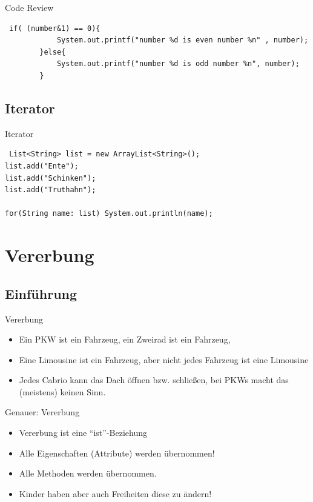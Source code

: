 \documentclass[18pt]{beamer}
\begin{document}
\begin{frame}[fragile]{Code Review}
 \begin{lstlisting}
 if( (number&1) == 0){
            System.out.printf("number %d is even number %n" , number);
        }else{
            System.out.printf("number %d is odd number %n", number);
        }
 \end{lstlisting}
\end{frame}

\subsection{Iterator}
\begin{frame}[fragile]{Iterator}
\begin{lstlisting}
 List<String> list = new ArrayList<String>();
list.add("Ente");
list.add("Schinken");
list.add("Truthahn");
 
for(String name: list) System.out.println(name);
\end{lstlisting}
 
\end{frame}




\section{Vererbung}
\subsection{Einführung}
\begin{frame}{Vererbung}

 \begin{itemize}
 \item Ein PKW ist ein Fahrzeug, ein Zweirad ist ein Fahrzeug, 
  \item Eine Limousine ist ein Fahrzeug, aber nicht jedes Fahrzeug ist eine Limousine
  \item Jedes Cabrio kann das Dach öffnen bzw. schließen, bei PKWs macht das (meistens) keinen Sinn.
 \end{itemize}
\end{frame}

\begin{frame}{Genauer: Vererbung}
 \begin{itemize}
  \item Vererbung ist eine ``ist''-Beziehung
  \item Alle Eigenschaften (Attribute) werden übernommen!
  \item Alle Methoden werden übernommen.
  \item Kinder haben aber auch Freiheiten diese zu ändern!
 \end{itemize}
\end{frame}
\end{document}
